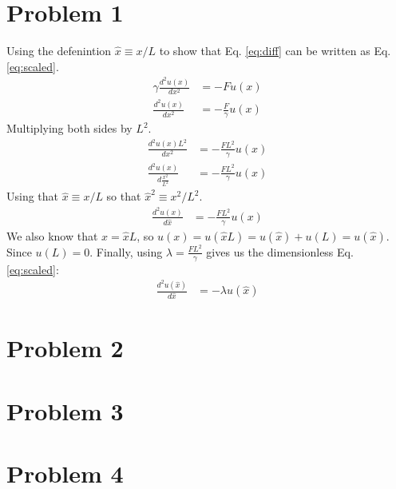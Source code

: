 \documentclass[english,notitlepage]{revtex4-1}  %
\begin{document}
\section*{Problem 1}
Using the defenintion $\hat{x} \equiv x / L$ to show that Eq. \ref*{eq:diff} can be written as Eq. \ref*{eq:scaled}.
\begin{align*}
    \gamma \frac{d^2u(x)}{dx^2} &= - F u(x) \\
    \frac{d^2u(x)}{dx^2} &= - \frac{F}{\gamma} u(x)
\end{align*}
Multiplying both sides by $L^2$.
\begin{align*}
    \frac{d^2u(x)L^2}{dx^2} &= - \frac{FL^2}{\gamma} u(x) \\
    \frac{d^2u(x)}{d\frac{x^2}{L^2}} &= - \frac{FL^2}{\gamma} u(x)
\end{align*}
Using that $\hat{x} \equiv x / L$ so that $\hat{x}^2 \equiv x^2 / L^2$.
\begin{align*}
    \frac{d^2u(x)}{d\hat{x}} &= - \frac{FL^2}{\gamma} u(x)
\end{align*}
We also know that $x = \hat{x}L$, so $u(x) = u(\hat{x}L) = u(\hat{x}) + u(L) = u(\hat{x})$. Since $u(L) = 0$. Finally, using $\lambda = \frac{FL^2}{\gamma}$ gives us the dimensionless Eq. \ref*{eq:scaled}:
\begin{align*}
    \frac{d^2u(\hat{x})}{d\hat{x}} &= - \lambda u(\hat{x})
\end{align*}
\section*{Problem 2}

\section*{Problem 3}

\section*{Problem 4}
\end{document}
